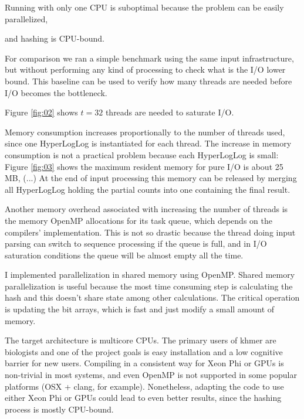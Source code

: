 \documentclass{bioinfo}
\begin{document}

Running with only one CPU is suboptimal because the problem can be easily parallelized,

and hashing is CPU-bound.

For comparison we ran a simple benchmark using the same input infrastructure,
but without performing any kind of processing to check what is the I/O lower bound.
This baseline can be used to verify how many threads are needed before I/O becomes the bottleneck.

Figure \ref{fig:02} shows $t=32$ threads are needed to saturate I/O.



Memory consumption increases proportionally to the number of threads used,
since one HyperLogLog is instantiated for each thread.
The increase in memory consumption is not a practical problem because each HyperLogLog is small:
Figure \ref{fig:03} shows the maximum resident memory for pure I/O is about 25 MB,
(...)
At the end of input processing this memory can be released by merging all HyperLogLog holding the partial counts into one containing the final result.

Another memory overhead associated with increasing the number of threads is the memory OpenMP allocations for its task queue,
which depends on the compilers' implementation.    %
This is not so drastic because the thread doing input parsing can switch to sequence processing if the queue is full,
and in I/O saturation conditions the queue will be almost empty all the time.




I implemented parallelization in shared memory using OpenMP.
Shared memory parallelization is useful because the most time consuming
step is calculating the hash and this doesn't share state among other calculations.
The critical operation is updating the bit arrays,
which is fast and just modify a small amount of memory.

The target architecture is multicore CPUs.
The primary users of khmer are biologists and one of the project goals is easy installation and a low cognitive barrier for new users.
Compiling in a consistent way for Xeon Phi or GPUs is non-trivial in most systems,
and even OpenMP is not supported in some popular platforms (OSX + clang, for example).
Nonetheless,
adapting the code to use either Xeon Phi or GPUs could lead to even better results,
since the hashing process is mostly CPU-bound.
\end{document}
